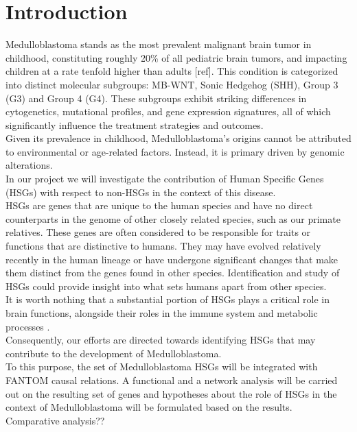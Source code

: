 \documentclass[10pt]{SelfArx} %
\affiliation{\textsuperscript{1}\textit{}} %
\affiliation{\textsuperscript{2}\textit{}} %
\affiliation{\textsuperscript{3}\textit{}} %
\affiliation{\textsuperscript{4}\textit{}} %
\affiliation{\textsuperscript{5}\textit{}} %
\begin{document}
\maketitle %



\section*{Introduction}\label{sec:introduction}
Medulloblastoma stands as the most prevalent malignant brain tumor in childhood, constituting roughly 20\% of all pediatric brain tumors, and impacting children at a rate tenfold higher than adults [ref]. This condition is categorized into distinct molecular subgroups: MB-WNT, Sonic Hedgehog (SHH), Group 3 (G3) and Group 4 (G4). These subgroups exhibit striking differences in cytogenetics, mutational profiles, and gene expression signatures, all of which significantly influence the treatment strategies and outcomes. \\
Given its prevalence in childhood, Medulloblastoma's origins cannot be attributed to environmental or age-related factors. Instead, it is primary driven by genomic alterations. \\
In our project we will investigate the contribution of Human Specific Genes (HSGs) with respect to non-HSGs in the context of this disease. \\
HSGs are genes that are unique to the human species and have no direct counterparts in the genome of other closely related species, such as our primate relatives. These genes are often considered to be responsible for traits or functions that are distinctive to humans. They may have evolved relatively recently in the human lineage or have undergone significant changes that make them distinct from the genes found in other species. Identification and study of HSGs could provide insight into what sets humans apart from other species. \\ 
It is worth nothing that a substantial portion of HSGs plays a critical role in brain functions, alongside their roles in the immune system and metabolic processes \cite{bitar2019genes}.\\
Consequently, our efforts are directed towards identifying HSGs that may contribute to the development of Medulloblastoma. \\
To this purpose, the set of Medulloblastoma HSGs will be integrated with FANTOM \cite{fantom5} causal relations. A functional and a network analysis will be carried out on the resulting set of genes and hypotheses about the role of HSGs in the context of Medulloblastoma will be formulated based on the results. \\
Comparative analysis??
\end{document}
